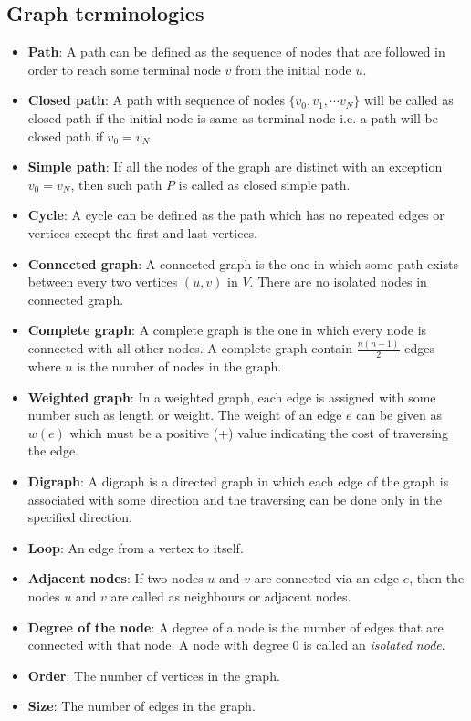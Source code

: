 \documentclass[a4paper,11pt]{book}
\begin{document}
\subsection{Graph terminologies}
\begin{itemize}
    \item \textbf{Path}: A path can be defined as the sequence of nodes that are followed in order to reach some terminal node $v$ from the initial node $u$.

\item \textbf{Closed path}: A path with sequence of nodes $\{v_0, v_1, \cdots v_N\}$ will be called as closed path if the initial node is same as terminal node i.e. a path will be closed path if $v_0=v_N$.

\item \textbf{Simple path}: If all the nodes of the graph are distinct with an exception $v_0=v_N$, then such path $P$ is called as closed simple path.

\item \textbf{Cycle}: A cycle can be defined as the path which has no repeated edges or vertices except the first and last vertices.

\item \textbf{Connected graph}: A connected graph is the one in which some path exists between every two vertices $(u, v)$ in $V$. There are no isolated nodes in connected graph.

\item \textbf{Complete graph}: A complete graph is the one in which every node is connected with all other nodes. A complete graph contain $\frac{n(n-1)}{2}$ edges where $n$ is the number of nodes in the graph.

\item \textbf{Weighted graph}: In a weighted graph, each edge is assigned with some number such as length or weight. The weight of an edge $e$ can be given as $w(e)$ which must be a positive (+) value indicating the cost of traversing the edge.

\item \textbf{Digraph}: A digraph is a directed graph in which each edge of the graph is associated with some direction and the traversing can be done only in the specified direction.

\item \textbf{Loop}: An edge from a vertex to itself.

\item \textbf{Adjacent nodes}: If two nodes $u$ and $v$ are connected via an edge $e$, then the nodes $u$ and $v$ are called as neighbours or adjacent nodes.

\item \textbf{Degree of the node}: A degree of a node is the number of edges that are connected with that node. A node with degree 0 is called an \textit{isolated node}.

\item \textbf{Order}: The number of vertices in the graph.

\item \textbf{Size}: The number of edges in the graph.
\end{itemize}
\end{document}
